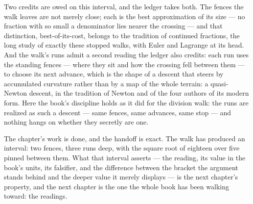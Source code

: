 Two credits are owed on this interval, and the ledger takes both. The fences the walk
leaves are not merely close; each is the best approximation of its size --- no
fraction with so small a denominator lies nearer the crossing --- and that
distinction, best-of-its-cost, belongs to the tradition of continued fractions, the
long study of exactly these stopped walks, with Euler and Lagrange at its head. And
the walk's runs admit a second reading the ledger also credits: each run uses the
standing fences --- where they sit and how the crossing fell between them --- to
choose its next advance, which is the shape of a descent that steers by accumulated
curvature rather than by a map of the whole terrain: a quasi-Newton descent, in the
tradition of Newton and of the four authors of its modern form. Here the book's
discipline holds as it did for the division walk: the runs are realized as such a
descent --- same fences, same advances, same stop --- and nothing hangs on whether
they secretly are one.

The chapter's work is done, and the handoff is exact. The walk has produced an
interval: two fences, three runs deep, with the square root of eighteen over five
pinned between them. What that interval asserts --- the reading, its value in the
book's units, its falsifier, and the difference between the bracket the argument
stands behind and the deeper value it merely displays --- is the next chapter's
property, and the next chapter is the one the whole book has been walking toward:
the readings.
